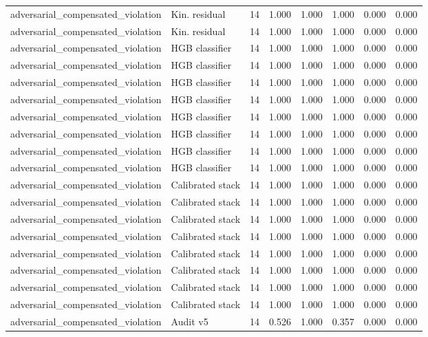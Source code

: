 {\begin{longtable}{llrrrrrr}
adversarial\_compensated\_violation & Kin. residual & 14 & 1.000 & 1.000 & 1.000 & 0.000 & 0.000 \\
adversarial\_compensated\_violation & Kin. residual & 14 & 1.000 & 1.000 & 1.000 & 0.000 & 0.000 \\
adversarial\_compensated\_violation & HGB classifier & 14 & 1.000 & 1.000 & 1.000 & 0.000 & 0.000 \\
adversarial\_compensated\_violation & HGB classifier & 14 & 1.000 & 1.000 & 1.000 & 0.000 & 0.000 \\
adversarial\_compensated\_violation & HGB classifier & 14 & 1.000 & 1.000 & 1.000 & 0.000 & 0.000 \\
adversarial\_compensated\_violation & HGB classifier & 14 & 1.000 & 1.000 & 1.000 & 0.000 & 0.000 \\
adversarial\_compensated\_violation & HGB classifier & 14 & 1.000 & 1.000 & 1.000 & 0.000 & 0.000 \\
adversarial\_compensated\_violation & HGB classifier & 14 & 1.000 & 1.000 & 1.000 & 0.000 & 0.000 \\
adversarial\_compensated\_violation & HGB classifier & 14 & 1.000 & 1.000 & 1.000 & 0.000 & 0.000 \\
adversarial\_compensated\_violation & HGB classifier & 14 & 1.000 & 1.000 & 1.000 & 0.000 & 0.000 \\
adversarial\_compensated\_violation & Calibrated stack & 14 & 1.000 & 1.000 & 1.000 & 0.000 & 0.000 \\
adversarial\_compensated\_violation & Calibrated stack & 14 & 1.000 & 1.000 & 1.000 & 0.000 & 0.000 \\
adversarial\_compensated\_violation & Calibrated stack & 14 & 1.000 & 1.000 & 1.000 & 0.000 & 0.000 \\
adversarial\_compensated\_violation & Calibrated stack & 14 & 1.000 & 1.000 & 1.000 & 0.000 & 0.000 \\
adversarial\_compensated\_violation & Calibrated stack & 14 & 1.000 & 1.000 & 1.000 & 0.000 & 0.000 \\
adversarial\_compensated\_violation & Calibrated stack & 14 & 1.000 & 1.000 & 1.000 & 0.000 & 0.000 \\
adversarial\_compensated\_violation & Calibrated stack & 14 & 1.000 & 1.000 & 1.000 & 0.000 & 0.000 \\
adversarial\_compensated\_violation & Calibrated stack & 14 & 1.000 & 1.000 & 1.000 & 0.000 & 0.000 \\
adversarial\_compensated\_violation & Audit v5 & 14 & 0.526 & 1.000 & 0.357 & 0.000 & 0.000 \\

\end{longtable}}
